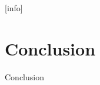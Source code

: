 \documentclass[10pt]{beamer}
\begin{document}
    [info]{}

	\section{Conclusion}

	\begin{frame}{Conclusion}
	\end{frame}
\end{document}
